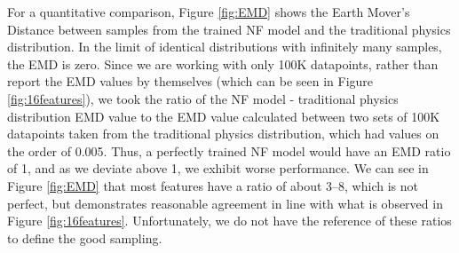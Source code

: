         For a quantitative comparison, Figure \ref{fig:EMD} shows the Earth Mover's Distance between samples from the trained NF model and the traditional physics distribution. In the limit of identical distributions with infinitely many samples, the EMD is zero. Since we are working with only 100K datapoints, rather than report the EMD values by themselves (which can be seen in Figure \ref{fig:16features}), we took the ratio of the NF model - traditional physics distribution EMD value to the EMD value calculated between two sets of 100K datapoints taken from the traditional physics distribution, which had values on the order of 0.005. Thus, a perfectly trained NF model would have an EMD ratio of 1, and as we deviate above 1, we exhibit worse performance. We can see in Figure \ref{fig:EMD} that most features have a ratio of about 3--8, which is not perfect, but demonstrates reasonable agreement in line with what is observed in Figure \ref{fig:16features}. Unfortunately, we do not have the reference of these ratios to define the good sampling.
   
